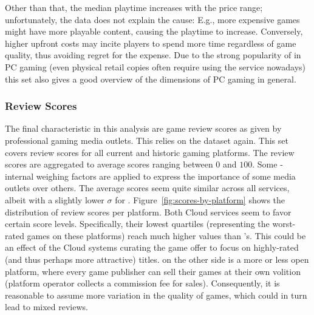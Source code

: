 Other than that, the median playtime increases with the price range;
unfortunately, the data does not explain the cause: E.g., more expensive
games might have more playable content, causing the playtime to
increase. Conversely, higher upfront costs may incite players to spend
more time regardless of game quality, thus avoiding regret for the
expense.
Due to the strong popularity of \steam in PC gaming (even physical
retail copies often require using the service nowadays) this set also
gives a good overview of the dimensions of PC gaming in general.


\subsubsection{Review Scores}

The final characteristic in this analysis are game review scores as
given by professional gaming media outlets. This relies on the
\metacritic dataset again. This set covers review scores for all current
and historic gaming platforms. The review scores are aggregated to
average scores ranging between $0$ and $100$. Some \metacritic-internal
weighing factors are applied to express the importance of some media
outlets over others.
The average scores seem quite similar across all services, albeit with a
slightly lower $\sigma$ for \gfnow. Figure~\ref{fig:scores-by-platform}
shows the distribution of review scores per platform. Both Cloud
services seem to favor certain score levels. Specifically, their lowest
quartiles (representing the worst-rated games on these platforms) reach
much higher values than \steam's. This could be an effect of the Cloud
systems curating the game offer to focus on highly-rated (and thus
perhaps more attractive) titles. \steam on the other side is a more or
less open platform, where every game publisher can sell their games at
their own volition (platform operator collects a commission fee for
sales). Consequently, it is reasonable to assume more variation in the
quality of games, which could in turn lead to mixed reviews.

